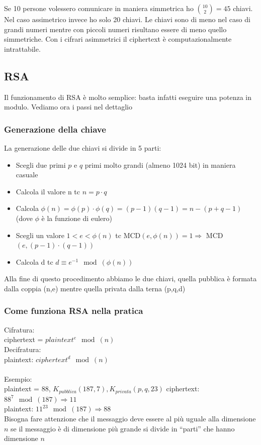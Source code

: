 \documentclass[10pt,a4paper]{article}
\begin{document}
Se 10 persone volessero comunicare in maniera simmetrica ho $\binom{10}{2} = 45$ chiavi. Nel caso assimetrico invece ho solo 20 chiavi. Le chiavi sono di meno nel caso di grandi numeri mentre con piccoli numeri risultano essere di meno quello simmetriche. Con i cifrari asimmetrici il ciphertext è computazionalmente intrattabile.
\subsection{RSA}
Il funzionamento di RSA è molto semplice: basta infatti eseguire una potenza in modulo. Vediamo ora i passi nel dettaglio
\subsubsection{Generazione della chiave}
La generazione delle due chiavi si divide in 5 parti:
\begin{itemize}
\item Scegli due primi $p$ e $q$ primi molto grandi (almeno 1024 bit) in maniera casuale
\item Calcola il valore n tc $n = p \cdot q$
\item Calcola $\phi(n) = \phi(p) \cdot \phi(q) = (p - 1)(q - 1) = n - (p + q -1)$ (dove $\phi$ è la funzione di eulero)
\item Scegli un valore $1<e<\phi(n)$ tc MCD$(e, \phi(n))=1 \Rightarrow$ MCD$(e,(p-1)\cdot(q-1))$
\item Calcola d tc $d \equiv e^{-1} \mod (\phi(n))$
\end{itemize}

Alla fine di questo procedimento abbiamo le due chiavi, quella pubblica è formata dalla coppia (n,e) mentre quella privata dalla terna (p,q,d)

\subsubsection{Come funziona RSA nella pratica}
Cifratura:\\
ciphertext = $plaintext^e \mod(n)$\\
Decifratura:\\
plaintext: $ciphertext^d \mod(n)$\\ \\
Esempio:\\
plaintext = 88, $K_{pubblica}(187,7), K_{privata}(p,q,23)$
ciphertext: $88^{7} \mod(187) \Rightarrow 11$\\
plaintext: $11^{23} \mod(187) \Rightarrow 88$\\
Bisogna fare attenzione che il messaggio deve essere al più uguale alla dimensione $n$ se il messaggio è di dimensione più grande si divide in ``parti'' che hanno dimensione $n$
\end{document}
